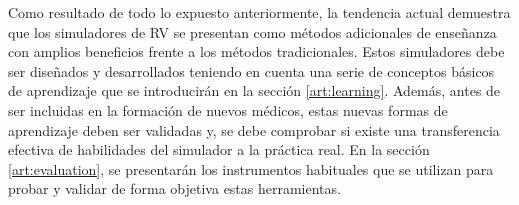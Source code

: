 Como resultado de todo lo expuesto anteriormente, la tendencia actual demuestra que los simuladores de \ac{RV} se presentan como métodos adicionales de enseñanza con amplios beneficios frente a los métodos tradicionales. Estos simuladores debe ser diseñados y desarrollados teniendo en cuenta una serie de conceptos básicos de aprendizaje que se introducirán  en la sección \ref{art:learning}.
Además, antes de ser incluidas en la formación de nuevos médicos, estas nuevas formas de aprendizaje deben ser validadas y, se debe comprobar si existe una transferencia efectiva de habilidades del simulador a la práctica real. En la sección \ref{art:evaluation}, se presentarán los instrumentos habituales que se utilizan para probar y validar de forma objetiva estas herramientas.








